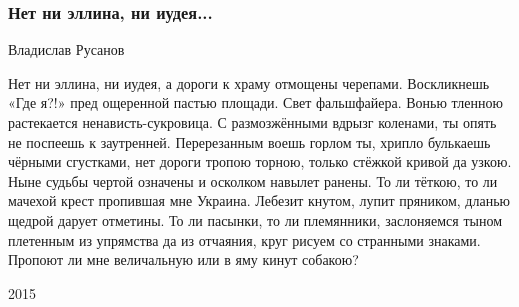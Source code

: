  
 
 

\subsubsection{Нет ни эллина, ни иудея...}
Владислав Русанов

Нет ни эллина, ни иудея,
а дороги к храму отмощены
черепами. Воскликнешь «Где я?!»
пред ощеренной пастью площади.
Свет фальшфайера. Вонью тленною
растекается ненависть-сукровица.
С размозжёнными вдрызг коленами,
ты опять не поспеешь к заутренней.
Перерезанным воешь горлом ты,
хрипло булькаешь чёрными сгустками,
нет дороги тропою торною,
только стёжкой кривой да узкою.
Ныне судьбы чертой означены
и осколком навылет ранены.
То ли тёткою, то ли мачехой
крест пропившая мне Украина.
Лебезит кнутом, лупит пряником,
дланью щедрой дарует отметины.
То ли пасынки, то ли племянники,
заслоняемся тыном плетенным
из упрямства да из отчаяния,
круг рисуем со странными знаками.
Пропоют ли мне величальную
или в яму кинут собакою?

2015 
